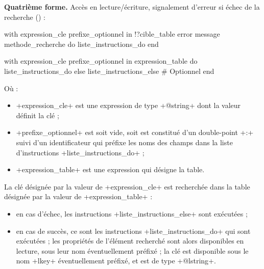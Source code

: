 \textbf{Quatrième forme.} Accès en lecture/écriture, signalement d'erreur si échec de la recherche () :
\begin{galgas}
with expression_cle prefixe_optionnel in !?cible_table
error message methode_recherche
do
  liste_instructions_do
end
\end{galgas}






\begin{galgas}
with expression_cle prefixe_optionnel in expression_table
do
  liste_instructions_do
else
  liste_instructions_else # Optionnel
end
\end{galgas}

Où :
\begin{itemize}
  \item \ggs+expression_cle+ est une expression de type \ggs+@string+ dont la valeur définit la clé ;
  \item \ggs+prefixe_optionnel+ est soit vide, soit est constitué d'un double-point \ggs+:+ suivi d'un identificateur qui préfixe les noms des champs dans la liste d'instructions \ggs+liste_instructions_do+ ;
  \item \ggs+expression_table+ est une expression qui désigne la table.
\end{itemize}

La clé désignée par la valeur de \ggs+expression_cle+ est recherchée dans la table désignée par la valeur de \ggs+expression_table+ :
\begin{itemize}
  \item en cas d'échec, les instructions \ggs+liste_instructions_else+ sont exécutées ;
  \item en cas de succès, ce sont les instructions \ggs+liste_instructions_do+ qui sont exécutées ; les propriétés de l'élément recherché sont alors disponibles en lecture, sous leur nom éventuellement préfixé ; la clé est disponible sous le nom \ggs+lkey+ éventuellement préfixé, et est de type \ggs+@lstring+.
\end{itemize}

%
%



